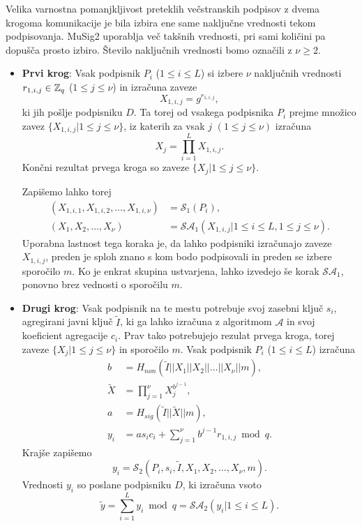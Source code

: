 Velika varnostna pomanjkljivost preteklih večstranskih podpisov z dvema krogoma komunikacije je bila
izbira ene same naključne vrednosti tekom podpisovanja. MuSig2 uporablja več takšnih vrednosti, pri
sami količini pa dopušča prosto izbiro. Število naključnih vrednosti bomo označili z $\nu \geq 2$.
\begin{itemize}
    \item \textbf{Prvi krog}:
        Vsak podpisnik $P_i$ ($1 \le i \le L$) si izbere $\nu$ naključnih
        vrednosti $r_{1, i, j} \in \mathbb Z_q$ ($1 \le j \le \nu$) in izračuna zaveze
        $$
        X_{1, i, j} = g^{r_{1, i, j}},
        $$
        ki jih pošlje podpisniku $D$. Ta torej od vsakega podpisnika $P_i$ prejme množico zavez
        $\{X_{1, i, j} | 1 \le j \le \nu\}$, iz katerih za vsak $j$ $(1 \le j \le \nu)$ izračuna
        $$
        X_j = \prod_{i=1}^L X_{1, i, j}.
        $$
        Končni rezultat prvega kroga so zaveze $\{X_j | 1 \le j \le \nu\}$.

        Zapišemo lahko torej
        \begin{align*}
            (X_{1, i, 1}, X_{1, i, 2}, \dots, X_{1, i, \nu}) &= \mathcal{S}_1(P_i), \\
            (X_1, X_2, \dots, X_\nu) &= \mathcal{S}\mathcal{A}_1(X_{1, i, j} | 1 \le i \le L, 1 \le j \le \nu).
        \end{align*}
        Uporabna lastnost tega koraka je, da lahko podpisniki izračunajo zaveze $X_{1, i, j}$, preden je
        sploh znano s kom bodo podpisovali in preden se izbere sporočilo $m$. Ko je enkrat skupina
        ustvarjena, lahko izvedejo še korak $\mathcal{S}\mathcal{A}_1$, ponovno brez vednosti o
        sporočilu $m$.

    \item \textbf{Drugi krog}:
        Vsak podpisnik na te mestu potrebuje svoj zasebni ključ $s_i$, agregirani javni ključ
        $\tilde{I}$, ki ga lahko izračuna z algoritmom $\mathcal{A}$ in svoj koeficient agregacije
        $c_i$. Prav tako potrebujejo rezulat prvega kroga, torej zaveze $\{X_j | 1 \le j \le \nu\}$
        in sporočilo $m$. Vsak podpisnik $P_i$ ($1 \le i \le L$) izračuna
        \begin{align*}
            b &= H_{non}(\tilde{I} || X_1 || X_2 || \dots || X_\nu || m), \\
            \tilde{X} &= \prod_{j=1}^\nu X_j^{b^{j-1}}, \\
            a &= H_{sig}(\tilde{I} || \tilde{X} || m), \\
            y_i &= a s_i c_i + \sum_{j=1}^\nu b^{j-1} r_{1, i, j} \bmod q.
        \end{align*}
        Krajše zapišemo
        $$
        y_i = \mathcal{S}_2(P_i, s_i, \tilde{I}, X_1, X_2, \dots, X_\nu, m).
        $$
        Vrednosti $y_i$ so poslane podpisniku $D$, ki izračuna vsoto
        $$
        \tilde{y} = \sum_{i=1}^L y_i \bmod q = \mathcal{S}\mathcal{A}_2(y_i | 1 \le i \le L).
        $$


\end{itemize}
